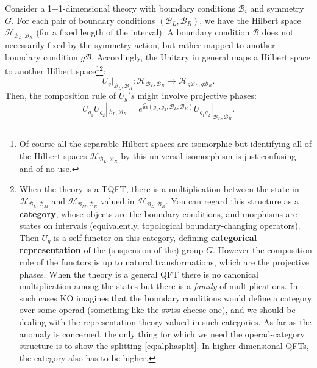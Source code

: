 \documentclass[
]{scrartcl}
\numberwithin{equation}{section}
\theoremstyle{definition}
\theoremstyle{definition}
\theoremstyle{definition}
\theoremstyle{definition}
\theoremstyle{remark}
\begin{document}
Consider a 1+1-dimensional theory with boundary conditions \(\mathcal{B}_i\)
and symmetry \(G\).
For each pair of boundary conditions \((\mathcal{B}_L,\mathcal{B}_R)\), we have the Hilbert space \(\mathcal{H}_{\mathcal{B}_L,\mathcal{B}_R}\) (for a fixed length of the interval).
A boundary condition \(\mathcal{B}\) does not necessarily fixed by the symmetry action, but rather mapped to another boundary condition \(g\mathcal{B}\).
Accordingly, the Unitary in general maps a Hilbert space to another Hilbert space\footnote{Of course all the separable Hilbert spaces are isomorphic but identifying all of the Hilbert spaces \(\mathcal{H}_{\mathcal{B}_L,\mathcal{B}_R}\) by this universal isomorphism is just confusing and of no use.}\footnote{When the theory is a TQFT, there is a multiplication between the state in \(\mathcal{H}_{\mathcal{B}_L,\mathcal{B}_M}\) and \(\mathcal{H}_{\mathcal{B}_M,\mathcal{B}_R}\) valued in \(\mathcal{H}_{\mathcal{B}_L,\mathcal{B}_R}\). You can regard this structure as a \textbf{category}, whose objects are the boundary conditions, and morphisms are states on intervals (equivalently, topological boundary-changing operators).
  Then \(U_g\) is a self-functor on this category, defining \textbf{categorical representation} of the (suspension of the) group \(G\).
  However the composition rule of the functors is up to natural transformations, which are the projective phases.
  When the theory is a general QFT there is no canonical multiplication among the states but there is a \emph{family} of multiplications. In such cases KO imagines that the boundary conditions would define a category over some operad (something like the swiss-cheese one), and we should be dealing with the representation theory valued in such categories.
  As far as the anomaly is concerned, the only thing for which we need the operad-category structure is to show the splitting \eqref{eq:alphasplit}.
  In higher dimensional QFTs, the category also has to be higher.}:
\begin{equation}
    \label{eq:UgB}
    U_g|_{\mathcal{B}_L,\mathcal{B}_R} : \mathcal{H}_{\mathcal{B}_L,\mathcal{B}_R} \to \mathcal{H}_{g\mathcal{B}_L,g\mathcal{B}_R}.
\end{equation}
Then, the composition rule of \(U_g's\) might involve projective phases:
\begin{equation}
    \label{eq:UBproj}
    U_{g_1}U_{g_2}|_{\mathcal{B}_L,\mathcal{B}_R} = e^{\mathrm{i}\tilde{\alpha}(g_1,g_2,\mathcal{B}_L,\mathcal{B}_R)}U_{g_1g_2}|_{\mathcal{B}_L,\mathcal{B}_R}.
\end{equation}
\end{document}
